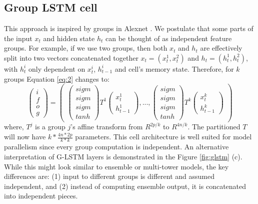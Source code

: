 \documentclass{article} \usepackage{iclr2017_workshop,times}
\begin{document}
\subsection{Group LSTM cell}
This approach is inspired by groups in Alexnet \citep{krizhevsky2012imagenet}. We postulate that some parts of the input $x_t$ and hidden state $h_t$ can be thought of as independent feature groups. For example, if we use two groups, then both $x_t$ and $h_t$ are effectively split into two vectors concatenated together $x_t=(x^1_t, x^2_t)$ and $h_t=(h^1_t, h^2_t)$, with $h^i_t$ only dependent on $x^i_t$, $h^i_{t-1}$ and cell's memory state. Therefore, for $k$ groups Equation \ref{eq:2} changes to:
\begin{equation}
\begin{pmatrix} i \\ f \\ o \\ g  \end{pmatrix} = \begin{pmatrix} \begin{pmatrix} sigm \\ sigm \\ sigm \\ tanh  \end{pmatrix} T^1 \begin{pmatrix} x^1_t \\ h^1_{t-1} \end{pmatrix}, ... , \begin{pmatrix} sigm \\ sigm \\ sigm \\ tanh  \end{pmatrix} T^k\begin{pmatrix} x^k_t \\ h^k_{t-1} \end{pmatrix} \end{pmatrix}
\end{equation}
where, $T^j$ is a group $j$'s affine transform from $R^{2p/k}$ to $R^{4n/k}$. The partitioned $T$ will now have $k*\frac{4n*2p}{k*k}$ parameters. This cell architecture is well suited for model parallelism since every group computation is independent.
An alternative interpretation of G-LSTM layers is demonstrated in the Figure \ref{fig:glstm} (c). 
While this might look similar to ensemble \citep{shazeer2017outrageously} or multi-tower \citep{ciregan2012multi} models, the key differences are: (1) input to different groups is different and assumed independent, and (2) instead of computing ensemble output, it is concatenated into independent pieces. 
\end{document}
